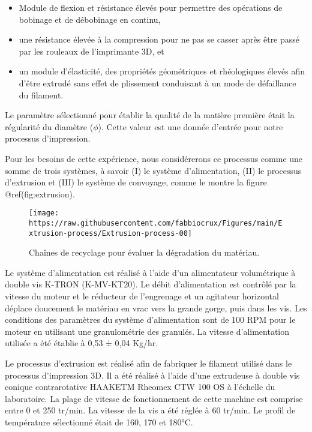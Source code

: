 \documentclass[
]{article}
\providecommand{\tightlist}{%
  \setlength{\itemsep}{0pt}\setlength{\parskip}{0pt}}
\begin{document}
\begin{itemize}
\tightlist
\item
  Module de flexion et résistance élevés pour permettre des opérations
  de bobinage et de débobinage en continu,
\item
  une résistance élevée à la compression pour ne pas se casser après
  être passé par les rouleaux de l'imprimante 3D, et
\item
  un module d'élasticité, des propriétés géométriques et rhéologiques
  élevés afin d'être extrudé sans effet de plissement conduisant à un
  mode de défaillance du filament.
\end{itemize}

Le paramètre sélectionné pour établir la qualité de la matière première
était la régularité du diamètre (\(\phi\)). Cette valeur est une donnée
d'entrée pour notre processus d'impression.

Pour les besoins de cette expérience, nous considérerons ce processus
comme une somme de trois systèmes, à savoir (I) le système
d'alimentation, (II) le processus d'extrusion et (III) le système de
convoyage, comme le montre la figure @ref(fig:extrusion).

\begin{figure}

{\centering \texttt{[image: https://raw.githubusercontent.com/fabbiocrux/Figures/main/Extrusion-process/Extrusion-process-00]} 

}

\caption{Chaînes de recyclage pour évaluer la dégradation du matériau.}\label{fig:extrusion}
\end{figure}

Le système d'alimentation est réalisé à l'aide d'un alimentateur
volumétrique à double vis K-TRON (K-MV-KT20). Le débit d'alimentation
est contrôlé par la vitesse du moteur et le réducteur de l'engrenage et
un agitateur horizontal déplace doucement le matériau en vrac vers la
grande gorge, puis dans les vis. Les conditions des paramètres du
système d'alimentation sont de 100 RPM pour le moteur en utilisant une
granulométrie des granulés. La vitesse d'alimentation utilisée a été
établie à 0,53 ± 0,04 Kg/hr.

Le processus d'extrusion est réalisé afin de fabriquer le filament
utilisé dans le processus d'impression 3D. Il a été réalisé à l'aide
d'une extrudeuse à double vis conique contrarotative HAAKETM Rheomex CTW
100 OS à l'échelle du laboratoire. La plage de vitesse de fonctionnement
de cette machine est comprise entre 0 et 250 tr/min. La vitesse de la
vis a été réglée à 60 tr/min. Le profil de température sélectionné était
de 160, 170 et 180°C.
\end{document}
